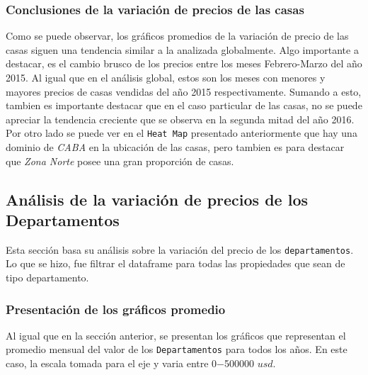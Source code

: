 \documentclass[a4paper, 10pt]{article}
\def\code#1{\texttt{#1}}
\newcommand\tab[1][0.5cm]{\hspace*{#1}}
\begin{document}
      \subsubsection{Conclusiones de la variación de precios de las casas}

        \tab Como se puede observar, los gráficos promedios de la variación de precio de las casas siguen una tendencia similar a la analizada globalmente. Algo importante a destacar, es el cambio brusco de los precios entre los meses Febrero-Marzo del año 2015. Al igual que en el análisis global, estos son los meses con menores y mayores precios de casas vendidas del año 2015 respectivamente. Sumando a esto, tambien es importante destacar que en el caso particular de las casas, no se puede apreciar la tendencia creciente que se observa en la segunda mitad del año 2016.
        \\
        \tab Por otro lado se puede ver en el \code{Heat Map} presentado anteriormente que hay una dominio de \textit{CABA} en la ubicación de las casas, pero tambien es para destacar que \textit{Zona Norte} posee una gran proporción de casas.

    \subsection{Análisis de la variación de precios de los Departamentos}

      \tab Esta sección basa su análisis sobre la variación del precio de los \code{departamentos}. Lo que se hizo, fue filtrar el dataframe para todas las propiedades que sean de tipo departamento.

      \subsubsection{Presentación de los gráficos promedio}
        \tab Al igual que en la sección anterior, se presentan los gráficos que representan el promedio mensual del valor de los \code{Departamentos} para todos los años. En este caso, la escala tomada para el eje y varia entre 0$-$500000 $usd$.
\end{document}
